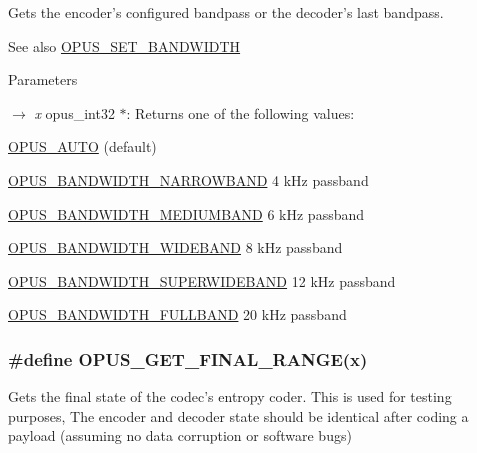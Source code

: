 Gets the encoder's configured bandpass or the decoder's last bandpass. \begin{DoxySeeAlso}{See also}
\hyperlink{group__opus__encoderctls_ga0178dabe5526d5b0667d81489cc93791}{OPUS\_\-SET\_\-BANDWIDTH} 
\end{DoxySeeAlso}

\begin{DoxyParams}{Parameters}
\item[\mbox{$\rightarrow$} {\em x}]{\ttfamily opus\_\-int32 $\ast$}: Returns one of the following values: 
\begin{DoxyDescription}
\item[\hyperlink{group__opus__ctlvalues_ga1c5b3244b018ff4548d2d6bffa418472}{OPUS\_\-AUTO} ](default) 
\item[\hyperlink{group__opus__ctlvalues_ga607dd310958b9c7d545d005e4572d47f}{OPUS\_\-BANDWIDTH\_\-NARROWBAND} ]4 kHz passband 
\item[\hyperlink{group__opus__ctlvalues_ga53a2aff4dc0ee23682927ca568c422a3}{OPUS\_\-BANDWIDTH\_\-MEDIUMBAND} ]6 kHz passband 
\item[\hyperlink{group__opus__ctlvalues_gac698e5d1281a3632251d2a4ead48afb9}{OPUS\_\-BANDWIDTH\_\-WIDEBAND} ]8 kHz passband 
\item[\hyperlink{group__opus__ctlvalues_ga41f86df35af0033a7361895da88671c1}{OPUS\_\-BANDWIDTH\_\-SUPERWIDEBAND}]12 kHz passband 
\item[\hyperlink{group__opus__ctlvalues_ga74cb052d8ec36cbcc9708c417558ebdd}{OPUS\_\-BANDWIDTH\_\-FULLBAND} ]20 kHz passband 
\end{DoxyDescription}\end{DoxyParams}
\hypertarget{group__opus__genericctls_ga1108a508aa475f964d247c1b04d26d89}{
\subsubsection[{OPUS\_\-GET\_\-FINAL\_\-RANGE}]{\setlength{\rightskip}{0pt plus 5cm}\#define OPUS\_\-GET\_\-FINAL\_\-RANGE(x)}}
\label{group__opus__genericctls_ga1108a508aa475f964d247c1b04d26d89}


Gets the final state of the codec's entropy coder. This is used for testing purposes, The encoder and decoder state should be identical after coding a payload (assuming no data corruption or software bugs)


